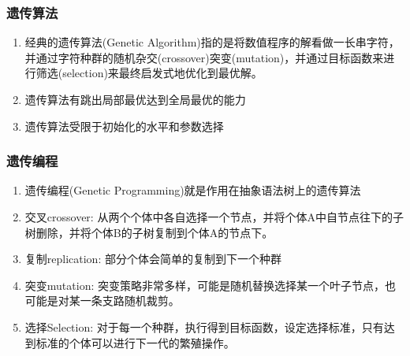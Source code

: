 \begin{frame}
    \frametitle{遗传算法}
    \begin{enumerate}
        \item 经典的遗传算法(Genetic Algorithm)指的是将数值程序的解看做一长串字符，并通过字符种群的随机杂交(crossover)突变(mutation)，并通过目标函数来进行筛选(selection)来最终启发式地优化到最优解。
        \item 遗传算法有跳出局部最优达到全局最优的能力
        \item 遗传算法受限于初始化的水平和参数选择
    \end{enumerate}
\end{frame}



\begin{frame}
    \frametitle{遗传编程}
    \begin{enumerate}
        \item 遗传编程(Genetic Programming)就是作用在抽象语法树上的遗传算法
        \item 交叉crossover: 从两个个体中各自选择一个节点，并将个体A中自节点往下的子树删除，并将个体B的子树复制到个体A的节点下。
        \item 复制replication: 部分个体会简单的复制到下一个种群
        \item 突变mutation: 突变策略非常多样，可能是随机替换选择某一个叶子节点，也可能是对某一条支路随机裁剪。
        \item 选择Selection: 对于每一个种群，执行得到目标函数，设定选择标准，只有达到标准的个体可以进行下一代的繁殖操作。
    \end{enumerate}
\end{frame}